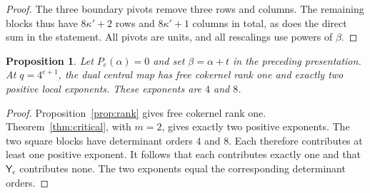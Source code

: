 \documentclass[11pt,a4paper,reqno]{amsart}
\numberwithin{equation}{section}
\theoremstyle{plain}
\newtheorem{proposition}[theorem]{Proposition}
\theoremstyle{definition}
\theoremstyle{remark}
\begin{document}
\begin{proof}
The three boundary pivots remove three rows and columns. The remaining
blocks thus have $8\kappa'+2$ rows and $8\kappa'+1$ columns in total,
as does the direct sum in the statement. All pivots are units, and all
rescalings use powers of $\beta$.
\end{proof}

\begin{proposition}\label{prop:doubled}
Let $P_e(\alpha)=0$ and set $\beta=\alpha+t$ in the preceding
presentation. At $q=4^{e+1}$, the dual central map has free cokernel
rank one and exactly two positive local exponents. These exponents are
$4$ and $8$.
\end{proposition}
\begin{proof}
Proposition~\ref{prop:rank} gives free cokernel rank one.
Theorem~\ref{thm:critical}, with $m=2$, gives exactly two positive
exponents. The two square blocks have determinant orders $4$ and $8$.
Each therefore contributes at least one positive exponent. It follows
that each contributes exactly one and that $\mathsf Y_e$ contributes none.
The two exponents equal the corresponding determinant orders.
\end{proof}
\end{document}
